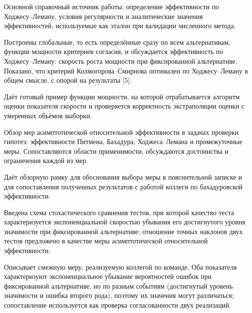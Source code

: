 \why Основной справочный источник работы: определение эффективности по Ходжесу--Леману,
условия регулярности и аналитические значения эффективностей, используемые как эталон при
валидации численного метода.


\review Построены глобальные, то есть определённые сразу по всем альтернативам, функции
мощности критериев согласия, и обсуждается эффективность по Ходжесу--Леману: скорость роста
мощности при фиксированной альтернативе. Показано, что критерий Колмогорова--Смирнова
оптимален по Ходжесу--Леману в общем смысле, с опорой на результаты [5].

\why Даёт готовый пример функции мощности, на которой отрабатывается алгоритм оценки
показателя скорости и проверяется корректность экстраполяции оценки с умеренных объёмов
выборки.


\review Обзор мер асимптотической относительной эффективности в задачах проверки гипотез:
эффективности Питмена, Бахадура, Ходжеса--Лемана и промежуточные меры. Сопоставляются
области применимости, обсуждаются достоинства и ограничения каждой из мер.

\why Даёт обзорную рамку для обоснования выбора меры в пояснительной записке и для
сопоставления полученных результатов с работой коллеги по бахадуровской эффективности.


\review Введена схема стохастического сравнения тестов, при которой качество теста
характеризуется экспоненциальной скоростью убывания его достигнутого уровня значимости при
фиксированной альтернативе; отношение точных наклонов двух тестов предложено в качестве
меры асимптотической относительной эффективности.

\why Описывает смежную меру, реализуемую коллегой по команде. Оба показателя
характеризуют экспоненциальное убывание вероятностей ошибок при фиксированной альтернативе,
но по разным событиям (достигнутый уровень значимости и ошибка второго рода), поэтому их
значения могут различаться; сопоставление используется как проверка согласованности двух
реализаций.

